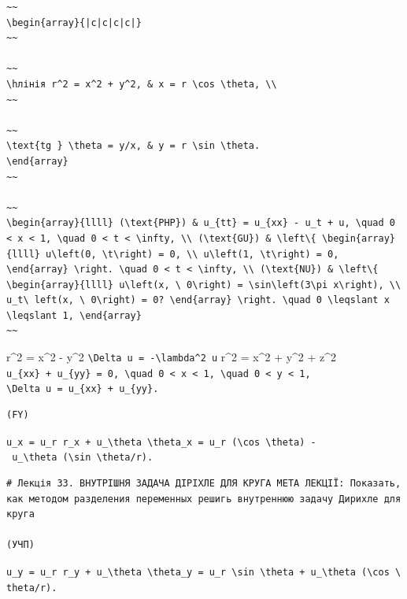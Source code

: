 \documentclass[
  ukrainian,
]{article}
\begin{document}
\begin{verbatim}
~~
\begin{array}{|c|c|c|c|}
~~

~~
\hлінія r^2 = x^2 + y^2, & x = r \cos \theta, \\
~~

~~
\text{tg } \theta = y/x, & y = r \sin \theta.
\end{array}
~~

~~
\begin{array}{llll} (\text{PHP}) & u_{tt} = u_{xx} - u_t + u, \quad 0 < x < 1, \quad 0 < t < \infty, \\ (\text{GU}) & \left\{ \begin{array}{llll} u\left(0, \t\right) = 0, \\ u\left(1, \t\right) = 0, \end{array} \right. \quad 0 < t < \infty, \\ (\text{NU}) & \left\{ \begin{array}{llll} u\left(x, \ 0\right) = \sin\left(3\pi x\right), \\ u_t\ left(x, \ 0\right) = 0? \end{array} \right. \quad 0 \leqslant x \leqslant 1, \end{array}
~~
\end{verbatim}

r\^{}2 = x\^{}2 - y\^{}2
\texttt{\textbackslash{}Delta\ u\ =\ -\textbackslash{}lambda\^{}2\ u}
r\^{}2 = x\^{}2 + y\^{}2 + z\^{}2
\texttt{u\_\{xx\}\ +\ u\_\{yy\}\ =\ 0,\ \textbackslash{}quad\ 0\ \textless{}\ x\ \textless{}\ 1,\ \textbackslash{}quad\ 0\ \textless{}\ y\ \textless{}\ 1,}
\texttt{\textbackslash{}Delta\ u\ =\ u\_\{xx\}\ +\ u\_\{yy\}.}

\begin{verbatim}
(FY)
\end{verbatim}

\texttt{u\_x\ =\ u\_r\ r\_x\ +\ u\_\textbackslash{}theta\ \textbackslash{}theta\_x\ =\ u\_r\ (\textbackslash{}cos\ \textbackslash{}theta)\ -\ u\_\textbackslash{}theta\ (\textbackslash{}sin\ \textbackslash{}theta/r).}

\begin{verbatim}
# Лекція 33. ВНУТРІШНЯ ЗАДАЧА ДІРІХЛЕ ДЛЯ КРУГА МЕТА ЛЕКЦІЇ: Показать, как методом разделения переменных решигь внутреннюю задачу Дирихле для круга

(УЧП)
\end{verbatim}

\texttt{u\_y\ =\ u\_r\ r\_y\ +\ u\_\textbackslash{}theta\ \textbackslash{}theta\_y\ =\ u\_r\ \textbackslash{}sin\ \textbackslash{}theta\ +\ u\_\textbackslash{}theta\ (\textbackslash{}cos\ \textbackslash{}theta/r).}
\end{document}
